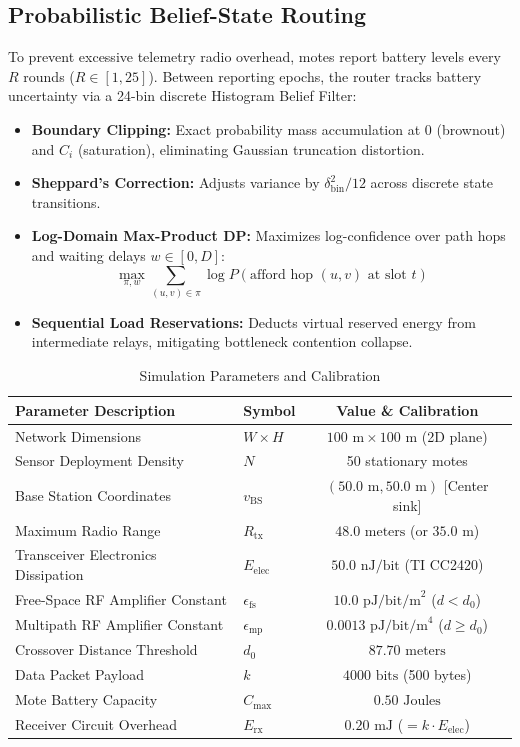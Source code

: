 \documentclass[conference]{IEEEtran}
\begin{document}
\subsection{Probabilistic Belief-State Routing}
To prevent excessive telemetry radio overhead, motes report battery levels every $R$ rounds ($R \in [1, 25]$). Between reporting epochs, the router tracks battery uncertainty via a 24-bin discrete Histogram Belief Filter:
\begin{itemize}
    \item \textbf{Boundary Clipping:} Exact probability mass accumulation at 0 (brownout) and $C_i$ (saturation), eliminating Gaussian truncation distortion.
    \item \textbf{Sheppard's Correction:} Adjusts variance by $\delta_{\text{bin}}^2 / 12$ across discrete state transitions.
    \item \textbf{Log-Domain Max-Product DP:} Maximizes log-confidence over path hops and waiting delays $w \in [0, D]$:
    \begin{equation}
    \max_{\pi, w} \sum_{(u, v) \in \pi} \log P(\text{afford hop } (u, v) \text{ at slot } t)
    \end{equation}
    \item \textbf{Sequential Load Reservations:} Deducts virtual reserved energy from intermediate relays, mitigating bottleneck contention collapse.
\end{itemize}

\begin{table}[!t]
\caption{Simulation Parameters and Calibration}
\label{tab:param}
\centering
\begin{tabular}{@{}llc@{}}
\toprule
\textbf{Parameter Description} & \textbf{Symbol} & \textbf{Value \& Calibration} \\
\midrule
Network Dimensions & $W \times H$ & $100\text{ m} \times 100\text{ m}$ (2D plane) \\
Sensor Deployment Density & $N$ & 50 stationary motes \\
Base Station Coordinates & $v_{\text{BS}}$ & $(50.0\text{ m}, 50.0\text{ m})$ [Center sink] \\
Maximum Radio Range & $R_{\text{tx}}$ & $48.0\text{ meters}$ (or $35.0\text{ m}$) \\
Transceiver Electronics Dissipation & $E_{\text{elec}}$ & $50.0\text{ nJ/bit}$ (TI CC2420) \\
Free-Space RF Amplifier Constant & $\epsilon_{\text{fs}}$ & $10.0\text{ pJ/bit/m}^2$ ($d < d_0$) \\
Multipath RF Amplifier Constant & $\epsilon_{\text{mp}}$ & $0.0013\text{ pJ/bit/m}^4$ ($d \ge d_0$) \\
Crossover Distance Threshold & $d_0$ & $87.70\text{ meters}$ \\
Data Packet Payload & $k$ & $4000\text{ bits}$ (500 bytes) \\
Mote Battery Capacity & $C_{\text{max}}$ & $0.50\text{ Joules}$ \\
Receiver Circuit Overhead & $E_{\text{rx}}$ & $0.20\text{ mJ}$ ($= k \cdot E_{\text{elec}}$) \\
\bottomrule
\end{tabular}
\end{table}
\end{document}
